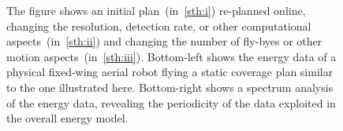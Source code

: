 \documentclass[letterpaper,10pt,journal,twoside]{IEEEtran}
\newcommand{\figpath}{./figures}
\theoremstyle{definition}
\begin{document}
\begin{figure}[t]
  \centering
  \vspace*{-6.8ex}
  \caption{%
  The figure shows an initial plan~(in~\ref{sth:i}) re-planned online, changing the resolution, detection rate, or other computational aspects~(in~\ref{sth:ii}) and changing the number of fly-byes or other motion aspects~(in~\ref{sth:iii}). 
  Bottom-left shows the energy data of a physical fixed-wing aerial robot flying a static coverage plan similar to the one illustrated here. Bottom-right shows a spectrum analysis of the energy data, revealing the periodicity of the data exploited in the overall energy model.
  }
  \label{fig:il-abs}
  \vspace*{-4ex}
\end{figure}
\end{document}
